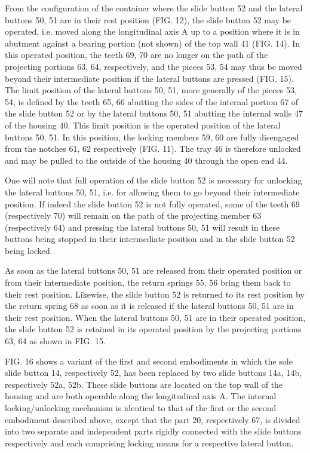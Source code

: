 \documentclass[11pt,a4paper]{article}
\begin{document}
From the configuration of the container where the slide button 52 and the lateral buttons 50, 51 are in their rest position (FIG. 12), the slide button 52 may be operated, i.e. moved along the longitudinal axis A up to a position where it is in abutment against a bearing portion (not shown) of the top wall 41 (FIG. 14). In this operated position, the teeth 69, 70 are no longer on the path of the projecting portions 63, 64, respectively, and the pieces 53, 54 may thus be moved beyond their intermediate position if the lateral buttons are pressed (FIG. 15). The limit position of the lateral buttons 50, 51, more generally of the pieces 53, 54, is defined by the teeth 65, 66 abutting the sides of the internal portion 67 of the slide button 52 or by the lateral buttons 50, 51 abutting the internal walls 47 of the housing 40. This limit position is the operated position of the lateral buttons 50, 51. In this position, the locking members 59, 60 are fully disengaged from the notches 61, 62 respectively (FIG. 11). The tray 46 is therefore unlocked and may be pulled to the outside of the housing 40 through the open end 44.

One will note that full operation of the slide button 52 is necessary for unlocking the lateral buttons 50, 51, i.e. for allowing them to go beyond their intermediate position. If indeed the slide button 52 is not fully operated, some of the teeth 69 (respectively 70) will remain on the path of the projecting member 63 (respectively 64) and pressing the lateral buttons 50, 51 will result in these buttons being stopped in their intermediate position and in the slide button 52 being locked.

As soon as the lateral buttons 50, 51 are released from their operated position or from their intermediate position, the return springs 55, 56 bring them back to their rest position. Likewise, the slide button 52 is returned to its rest position by the return spring 68 as soon as it is released if the lateral buttons 50, 51 are in their rest position. When the lateral buttons 50, 51 are in their operated position, the slide button 52 is retained in its operated position by the projecting portions 63, 64 as shown in FIG. 15.

FIG. 16 shows a variant of the first and second embodiments in which the sole slide button 14, respectively 52, has been replaced by two slide buttons 14a, 14b, respectively 52a, 52b. These slide buttons are located on the top wall of the housing and are both operable along the longitudinal axis A. The internal locking/unlocking mechanism is identical to that of the first or the second embodiment described above, except that the part 20, respectively 67, is divided into two separate and independent parts rigidly connected with the slide buttons respectively and each comprising locking means for a respective lateral button.
\end{document}
